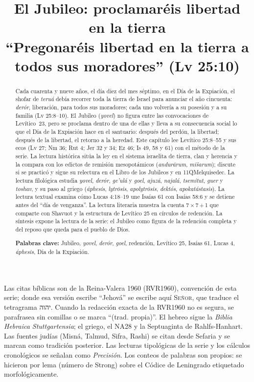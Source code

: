 \documentclass[11pt,letterpaper]{article}
\title{\color{tierraroja}\bfseries El Jubileo: proclamaréis libertad en la tierra\\[4pt]\large\color{sepia}\mdseries ``Pregonaréis libertad en la tierra a todos sus moradores'' (Lv 25:10)}
\author{}\date{}
\newcommand{\heb}[1]{\mbox{\foreignlanguage{hebrew}{#1}}}
\newcommand{\SENOR}{\textsc{Señor}}
\begin{document}
\maketitle\thispagestyle{empty}

\begin{abstract}\noindent
Cada cuarenta y nueve años, el día diez del mes séptimo, en el Día de la Expiación, el shofar de \emph{teruá} debía recorrer toda la tierra de Israel para anunciar el año cincuenta: \emph{derór}, liberación, para todos sus moradores; cada uno volvería a su posesión y a su familia (Lv 25:8--10). El Jubileo (\emph{yovel}) no figura entre las convocaciones de Levítico~23, pero se proclama dentro de una de ellas y lleva a su consecuencia social lo que el Día de la Expiación hace en el santuario: después del perdón, la libertad; después de la libertad, el retorno a la heredad. Este capítulo lee Levítico 25:8--55 y sus ecos (Lv 27; Nm 36; Rut 4; Jer 32 y 34; Ez 46; Is 49, 58 y 61) con el método de la serie. La lectura histórica sitúa la ley en el sistema israelita de tierra, clan y herencia y la compara con los edictos de remisión mesopotámicos (\emph{andurārum}, \emph{mīšarum}); discute si se practicó y sigue su relectura en el Libro de los Jubileos y en 11QMelquisedec. La lectura filológica estudia \emph{yovel}, \emph{derór}, \emph{ge'ulá} y \emph{goel}, \emph{ajuzá}, \emph{najalá}, \emph{tsemitut}, \emph{guer} y \emph{toshav}, y su paso al griego (\emph{áphesis}, \emph{lytrōsis}, \emph{apolytrōsis}, \emph{dektós}, \emph{apokatástasis}). La lectura textual examina cómo Lucas 4:18--19 une Isaías 61 con Isaías 58:6 y se detiene antes del ``día de venganza''. La lectura literaria muestra la cuenta 7\,×\,7\,+\,1 que comparte con Shavuot y la estructura de Levítico 25 en círculos de redención. La síntesis expone la lectura de la serie: el Jubileo como figura de la redención completa y del reposo que queda para el pueblo de Dios.
\par\smallskip\noindent\textbf{Palabras clave:} Jubileo, \emph{yovel}, \emph{derór}, \emph{goel}, redención, Levítico 25, Isaías 61, Lucas 4, \emph{áphesis}, Día de la Expiación.\end{abstract}

\begin{nota}
Las citas bíblicas son de la Reina-Valera 1960 (RVR1960), convención de esta serie; donde esa versión escribe ``Jehová'' se escribe aquí \SENOR, que traduce el tetragrama \heb{יהוה}. Cuando la redacción exacta de la RVR1960 no es segura, se parafrasea sin comillas o se marca ``(trad. propia)''. El hebreo sigue la \emph{Biblia Hebraica Stuttgartensia}; el griego, el NA28 y la Septuaginta de Rahlfs-Hanhart. Las fuentes judías (Misná, Talmud, Sifra, Rashi) se citan desde Sefaria y se marcan como tradición posterior. Las lecturas tipológicas de la serie y los cálculos cronológicos se señalan como \emph{Precisión}. Los conteos de palabras son propios: se hicieron por lema (número de Strong) sobre el Códice de Leningrado etiquetado morfológicamente.
\end{nota}
\end{document}
